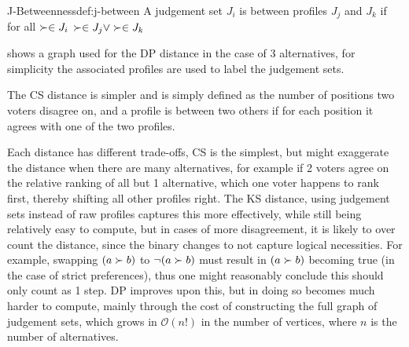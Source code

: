 \begin{definition}{J-Betweenness}{def:j-between}
	A judgement set $J_i$ is between profiles $J_j$ and $J_k$ if for all $\succ \in J_i$ \quad $\succ \in J_j \vee \succ \in J_k$
\end{definition}

 shows a graph used for the DP distance in the case of 3 alternatives, for simplicity the associated profiles are used to label the judgement sets.



The CS distance is simpler and is simply defined as the number of positions two voters disagree on, and a profile is between two others if for each position it agrees with one of the two profiles.

Each distance has different trade-offs, CS is the simplest, but might exaggerate the distance when there are many alternatives, for example if 2 voters agree on the relative ranking of all but 1 alternative, which one voter happens to rank first, thereby shifting all other profiles right. The KS distance, using judgement sets instead of raw profiles captures this more effectively, while still being relatively easy to compute, but in cases of more disagreement, it is likely to over count the distance, since the binary changes to not capture logical necessities. For example, swapping $( a \succ b)$ to $\neg (a \succ b)$ must result in $(a \succ b)$ becoming true (in the case of strict preferences), thus one might reasonably conclude this should only count as 1 step. DP improves upon this, but in doing so becomes much harder to compute, mainly through the cost of constructing the full graph of judgement sets, which grows in $\mathcal{O}(n!)$ in the number of vertices, where $n$ is the number of alternatives.


